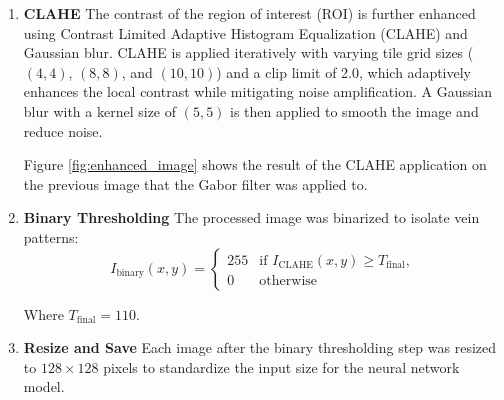 \begin{enumerate}
    \item \textbf{CLAHE}
    The contrast of the region of interest (ROI) is further enhanced using Contrast Limited Adaptive Histogram Equalization (CLAHE) and Gaussian blur. CLAHE is applied iteratively with varying tile grid sizes (\((4, 4)\), \((8, 8)\), and \((10, 10)\)) and a clip limit of 2.0, which adaptively enhances the local contrast while mitigating noise amplification. A Gaussian blur with a kernel size of \((5, 5)\) is then applied to smooth the image and reduce noise.

    Figure \ref{fig:enhanced_image} shows the result of the CLAHE application on the previous image that the Gabor filter was applied to.

    \item \textbf{Binary Thresholding}
    The processed image was binarized to isolate vein patterns:
    \[
    I_{\text{binary}}(x, y) =
    \begin{cases}
    255 & \text{if } I_{\text{CLAHE}}(x, y) \geq T_{\text{final}}, \\
    0 & \text{otherwise}
    \end{cases}
    \]

    Where \( T_{\text{final}} = 110 \).

    \item \textbf{Resize and Save} 
    Each image after the binary thresholding step was resized to \( 128 \times 128 \) pixels to standardize the input size for the neural network model.


\end{enumerate}
